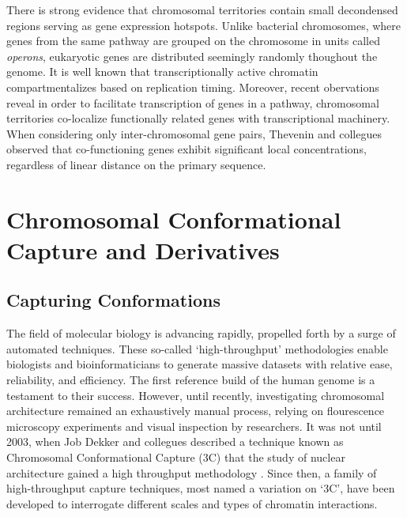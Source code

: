 \documentclass[phd,tocprelim]{cornell}
\begin{document}
There is strong evidence that chromosomal territories contain small decondensed regions serving as gene
expression hotspots.  Unlike bacterial chromosomes, where genes from the same pathway are grouped on the
chromosome in units called \textit{operons}, eukaryotic genes are distributed seemingly randomly thoughout
the genome\cite{jacob1961}.  It is well known that transcriptionally active chromatin compartmentalizes based
on replication timing\cite{ferreira1997}\cite{sadoni1999}\cite{thevenin2014}.  Moreover, recent obervations
reveal in order to facilitate transcription of genes in a pathway, chromosomal territories co-localize
functionally related genes with transcriptional machinery.  When considering only inter-chromosomal gene pairs,
Thevenin and collegues observed that co-functioning genes exhibit significant local concentrations, regardless
of linear distance on the primary sequence\cite{thevenin2014}.



\chapter{Chromosomal Conformational Capture and Derivatives}

\section{Capturing Conformations}

The field of molecular biology is advancing rapidly, propelled forth by a
surge of automated techniques.  These so-called `high-throughput' methodologies
enable biologists and bioinformaticians to generate massive datasets with
relative ease, reliability, and efficiency.  The first reference build of the
human genome is a testament to their success\cite{hgsc2004}.  However,
until recently, investigating chromosomal architecture remained an
exhaustively manual process, relying on flourescence microscopy experiments and
visual inspection by researchers.  It was not until 2003, when Job Dekker and
collegues described a technique known as Chromosomal Conformational Capture
(3C) that the study of nuclear architecture gained a high throughput methodology
\cite{dekker2002}. Since then, a family of high-throughput capture techniques,
most named a variation on `3C', have been developed to interrogate
different scales and types of chromatin interactions.
\end{document}
